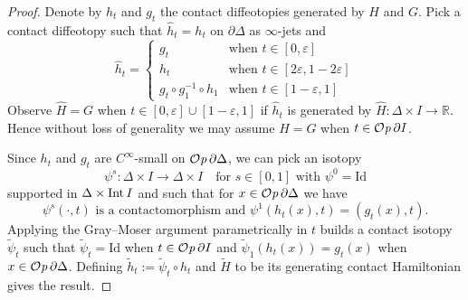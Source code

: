 \documentclass[12pt]{paper}
\let\oldmarginpar\marginpar
\renewcommand\marginpar[1]{\-\oldmarginpar[\raggedleft\footnotesize #1]%
{\raggedright\footnotesize #1}}
\theoremstyle{plain}
\theoremstyle{definition}
\newcommand{\wt}{\widetilde}
\newcommand{\wh}{\widehat}
\newcommand{\p}{\partial}
\newcommand{\eps}{\varepsilon}
\newcommand{\R}{{\mathbb{R}}}
\newcommand{\Int}{{\rm Int\,}} %
\newcommand{\Id}{\mathrm {Id}}
\def\Op{{\mathcal O}{\it p}\,}
\numberwithin{figure}{section}
\begin{document}
\begin{proof}
Denote by $h_t$ and $g_t$ the contact diffeotopies generated by $H$ and $G$.  
Pick a contact diffeotopy such that $\wh{h}_t = h_t$ on $\p\Delta$ as $\infty$-jets and
$$
	\wh{h}_t =\begin{cases}
	g_t &\mbox{when $t \in [0,\eps]$}\\
	h_t &\mbox{when $t \in [2\eps,1-2\eps]$}\\
	g_t \circ g_1^{-1}\circ h_1 &\mbox{when $t \in [1-\eps,1]$}
	\end{cases}
$$
Observe $\wh{H} = G$ when $t \in [0,\eps] \cup [1-\eps, 1]$ if $\wh{h}_t$ is generated by $\wh{H}: \Delta \times I \to \R$.
Hence without loss of generality we may assume $H = G$ when $t \in \Op \p I$.

Since $h_t$ and $g_t$ are $C^\infty$-small on $\Op \p\Delta$, we can pick an isotopy 
$$
\psi^s: \Delta \times I \to \Delta \times I \quad\mbox{for $s\in [0,1]$ with $\psi^0 = \Id$}
$$
supported in $\Delta \times \Int I$ and such that for $x \in \Op \p\Delta$ we have
$$
	\mbox{$\psi^s(\cdot, t)$ is a contactomorphism and
	 $\psi^1(h_t(x), t) = (g_t(x), t)$.}%
$$
Applying the Gray--Moser argument parametrically in $t$ builds a contact isotopy
$\tilde{\psi}_t$ such that $\tilde{\psi}_t = \Id$ when $t \in \Op \p I$ and $\tilde\psi_1(h_t(x)) = g_t(x)$
when $x \in \Op \p\Delta$.  Defining $\tilde{h}_t:= \tilde\psi_t \circ h_t$ and $\wt{H}$ to be its generating
contact Hamiltonian gives the result.
\end{proof}
 
\end{document}
